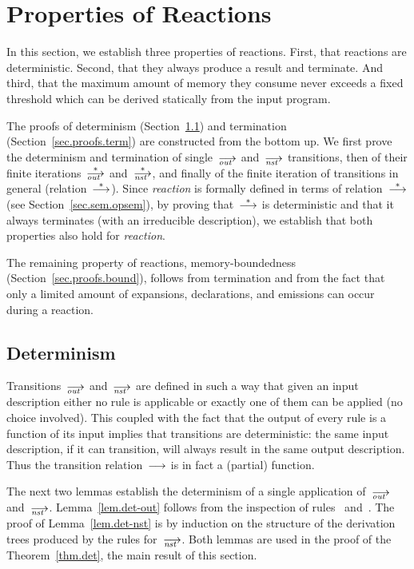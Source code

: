 \section{Properties of \CEU Reactions}
\label{sec.proofs}

In this section, we establish three properties of \CEU reactions.  First,
that reactions are deterministic.  Second, that they always produce a result
and terminate. And third, that the maximum amount of memory they consume
never exceeds a fixed threshold which can be derived statically from the
input program.

The proofs of determinism (Section~\ref{sec.proofs.det}) and termination
(Section~\ref{sec.proofs.term}) are constructed from the bottom up.  We
first prove the determinism and termination of single~$\out$ and~$\nst$
transitions, then of their finite iterations~$\out[*]$ and~$\nst[*]$, and
finally of the finite iteration of transitions in general
(relation~$\trans[*]$).  Since \emph{reaction} is formally defined in terms
of relation~$\trans[*]$ (see Section~\ref{sec.sem.opsem}), by proving
that~$\trans[*]$ is deterministic and that it always terminates (with an
irreducible description), we establish that both properties also hold for
\emph{reaction}.

The remaining property of reactions, memory-bound\-ed\-ness
(Section~\ref{sec.proofs.bound}), follows from termination and from the fact
that only a limited amount of expansions, declarations, and emissions can
occur during a reaction.

\subsection{Determinism}
\label{sec.proofs.det}

Transitions~$\out$ and~$\nst$ are defined in such a way that given an input
description either no rule is applicable or exactly one of them can be
applied (no choice involved).  This coupled with the fact that the output of
every rule is a function of its input implies that transitions are
deterministic: the same input description, if it can transition, will always
result in the same output description.  Thus the transition
relation~$\trans$ is in fact a (partial) function.

The next two lemmas establish the determinism of a single application
of~$\out$ and~$\nst$.  Lemma~\ref{lem.det-out} follows from the
inspection of rules~ and~.  The proof of
Lemma~\ref{lem.det-nst} is by induction on the structure of the derivation
trees produced by the rules for~$\nst$.  Both lemmas are used in the proof
of the Theorem~\ref{thm.det}, the main result of this section.

